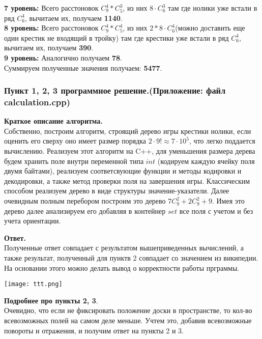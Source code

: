 \documentclass[12pt,a4paper]{scrartcl}
\begin{document}
\textbf{7 уровень:} Всего расстоновок $C_9^4*C_5^3$, из них $8\cdot C_6^3$ там где нолики уже встали в ряд $C_6^4$, вычитаем их, получаем \textbf{1140}.\\

\textbf{8 уровень:} Всего расстоновок $C_9^4*C_5^4$, из них $2*8\cdot C_6^4$(можно доставить еще один крестик не входящий в тройку) там где крестики уже встали в ряд $C_6^4$, вычитаем их, получаем \textbf{390}.\\

\textbf{9 уровень:} Аналогично получаем \textbf{78}.\\

Суммируем полученные значения получаем: \textbf{5477}.

\subsubsection*{Пункт 1, 2, 3 программное решение.(Приложение: файл calculation.cpp)}

\textbf{Краткое описание алгоритма.}\\
Собственно, построим алгоритм, строящий дерево игры крестики нолики, если оценить его сверху оно имеет размер порядка $2\cdot9! \approx 7\cdot10^5$, что легко поддается вычислению. Реализуем этот алгоритм на C++, для уменьшения размера дерева будем хранить поле внутри переменной типа $int$ (кодируем каждую ячейку поля двумя байтами), реализуем соответсвующие функции и методы кодировки и декодировки, а также метод проверки поля на завершения игры. Классическим способом реализуем дерево в виде структуры значение-указатели. Далее очевидным полным перебором построим это дерево
$7C_9^2 + 2C_9^2 +9$. Имея это дерево далее анализируем его добавляя в контейнер $set$ все поля с учетом и без учета ориентации.

\textbf{Ответ.}\\
Полученные ответ совпадает с результатом вышеприведенных вычислений, а также результат, полученный для пунктв 2 совпадает со значением из википедии. На основании этого можно делать вывод о корректности работы прграммы.

\begin{center}
    \texttt{[image: ttt.png]}
\end{center}

\textbf{Подробнее про пункты 2, 3}.\\
Очевидно, что если не фиксировать положение доски в пространстве, то кол-во всевозможных полей на самом деле меньше. Учтем это, добавив всевозможные повороты и отражения, и получим ответ на пункты 2 и 3. 
\end{document}
